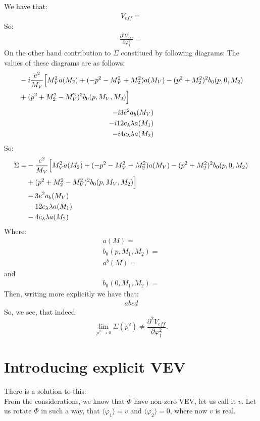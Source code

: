 We have that:
\begin{align}
V_{eff} = 
\end{align}
So:
\begin{align}
\frac{\partial^2V_{eff}}{\partial\varphi_1^2} = 
\end{align}
On the other hand contribution to $\Sigma$ constitued by following diagrams: 
The values of these diagrams are as follows:
\begin{align}
&-i\frac{e^2}{M_V}\Big[M_V^2a(M_2)+(-p^2-M_V^2+M_2^2)a(M_V)-(p^2+M_2^2)^2b_0(p,0,M_2) 
\notag\\ 
&+(p^2+M_2^2-M_V^2)^2b_0(p,M_V,M_2)\Big]
\end{align}
\begin{align}
-i3e^2a_b(M_V) \\
-i12c_\lambda\lambda a(M_1) \\
-i4c_\lambda\lambda a(M_2) 
\end{align}
So:
\begin{align}
\Sigma = &-\frac{e^2}{M_V}\Big[M_V^2a(M_2)+(-p^2-M_V^2+M_2^2)a(M_V)-(p^2+M_2^2)^2b_0(p,0,M_2) 
\notag\\ 
&+(p^2+M_2^2-M_V^2)^2b_0(p,M_V,M_2)\Big] \notag \\
&-3e^2a_b(M_V) \notag\\
&-12c_\lambda\lambda a(M_1)\notag \\
&-4c_\lambda\lambda a(M_2) 
\end{align}
Where:
\begin{align}
a(M) = \\
b_0(p,M_1,M_2) = \\
a^b(M) = 
\end{align}
and
\begin{align}
b_0(0,M_1,M_2) = 
\end{align}
Then, writing more explicitly we have that:
\begin{align}
abcd
\end{align}
So, we see, that indeed:
\begin{equation}
\lim\limits_{p^2\to 0}\Sigma(p^2) \neq \frac{\partial^2V_{eff}}{\partial\varphi_1^2}.
\end{equation}
\section{Introducing explicit VEV}
There is a solution to this: \\

From the \MSbar considerations, we know that $\Phi$ have non-zero VEV, let us 
call it $v$. 
Let us rotate $\Phi$ in such a way, that $\langle\varphi_1\rangle=v$ and $\langle\varphi_2\rangle 
= 0$, where now $v$ is real. \\

